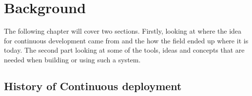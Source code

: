 %
%
%
%
%
%

\section{Background}

The following chapter will cover two sections. Firstly, looking at where the idea for continuous development came from and the how the field ended up where it is today. The second part looking at some of the tools, ideas and concepts that are needed when building or using such a system.

\subsection{History of Continuous deployment}

